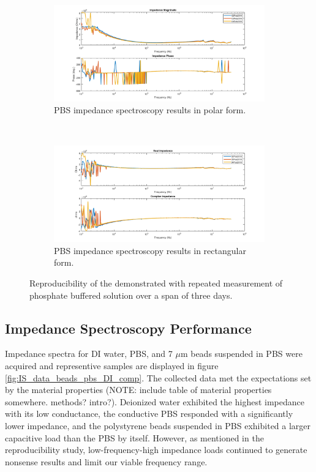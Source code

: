 \begin{figure}[h]
    \centering
    \begin{subfigure}[b]{\textwidth}
        \centering
        \includegraphics[width=\textwidth]{images/reproducibility_PBS_mag_phase.png}
        \caption{PBS impedance spectroscopy results in polar form.}
    \end{subfigure}
    \\
    \vspace{0.1 in}
    \begin{subfigure}[b]{\textwidth}
        \centering
        \includegraphics[width=\textwidth]{images/reproducibility_PBS_real_imag.png}
        \caption{PBS impedance spectroscopy results in rectangular form.}
    \end{subfigure}
    \caption{Reproducibility of the demonstrated with repeated measurement of phosphate buffered solution over a span of three days.}
    \label{fig:IS_data_reproducibility}
\end{figure}

\subsection{Impedance Spectroscopy Performance}

\par Impedance spectra for DI water, PBS, and 7 $\mu$m beads suspended in PBS were acquired and representive samples are displayed in figure \ref{fig:IS_data_beads_pbs_DI_comp}. The collected data met the expectations set by the material properties (NOTE: include table of material properties somewhere. methods? intro?). Deionized water exhibited the highest impedance with its low conductance, the conductive PBS responded with a significantly lower impedance, and the polystyrene beads suspended in PBS exhibited a larger capacitive load than the PBS by itself. However, as mentioned in the reproducibility study, low-frequency-high impedance loads continued to generate nonsense results and limit our viable frequency range.


